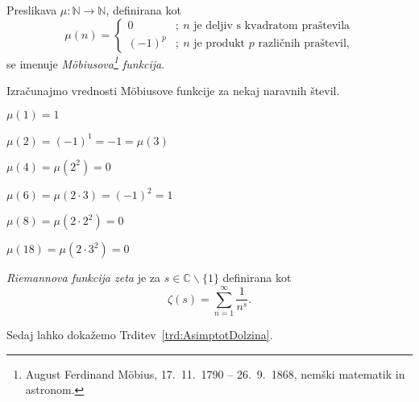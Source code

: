 \documentclass[mat1]{fmfdelo}
\begin{document}
\begin{definicija}
\label{def:MobFun}
Preslikava \( \mu\colon \mathbb{N} \to \mathbb{N} \), definirana kot
\[
\mu(n) = \left\{
\begin{array}{rl}
0 & ;\ \mbox{$n$ je deljiv s kvadratom praštevila}\\
(-1)^p & ;\  \mbox{$n$ je produkt $p$ različnih praštevil,}
\end{array}
\right.
\]
se imenuje \emph{M\"obiusova\footnote{August Ferdinand M\"obius, 17.~11.~1790 -- 26.~9.~1868, nemški matematik in astronom.} funkcija}.
\end{definicija}

\begin{primer}
Izračunajmo vrednosti M\"obiusove funkcije za nekaj naravnih števil.

\( \mu(1)=1 \)

\( \mu(2)=(-1)^{1}=-1=\mu(3) \)

\( \mu(4)=\mu(2^{2})=0 \)

\( \mu(6)=\mu(2\cdot3)=(-1)^{2}=1 \)

\( \mu(8)=\mu(2\cdot2^{2})=0 \)

\( \mu(18)=\mu(2\cdot3^{2})=0 \)
\end{primer}

\begin{definicija}
\label{def:RiemZeta}
\emph{Riemannova funkcija zeta} je za
 $s\in\mathbb{C}\backslash\{1\}$
definirana kot
\[ \zeta(s) = \sum_{n=1}^{\infty}\frac{1}{n^s}. \]
\end{definicija}

%
Sedaj lahko dokažemo Trditev~\ref{trd:AsimptotDolzina}.
\end{document}
